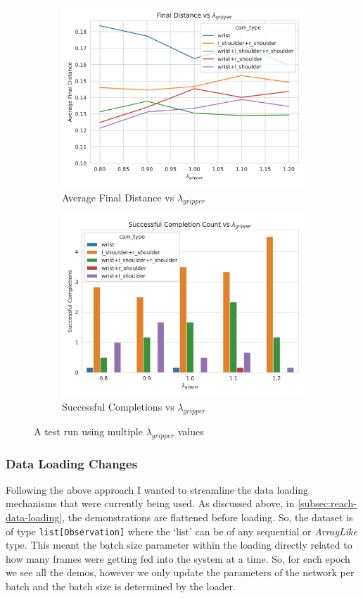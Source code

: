 \begin{figure}[htpb] %
  \centering
  \begin{subfigure}{0.45\linewidth}
    \centering
    \includegraphics[width=0.6\linewidth]{assets/cam-comb/grasp-simple/tuning-normal-old-policy-lambda-g.png}
    \caption{Average Final Distance vs $\lambda_{gripper}$}\label{subfig:grasp-tuning-lambda-g}
  \end{subfigure}
  \begin{subfigure}{0.45\linewidth}
    \centering
    \includegraphics[width=0.6\linewidth]{assets/cam-comb/grasp-simple/tuning-normal-old-policy-success-lambda-g.png}
    \caption{Successful Completions vs $\lambda_{gripper}$}\label{subfig:grasp-tuning-lambda-g-success}
  \end{subfigure}
  \caption{A test run using multiple $\lambda_{gripper}$ values}\label{fig:grasp-tuning-lambda-g}
\end{figure}


\subsubsection{Data Loading Changes}\label{subsec:grasp-data-loading-changes}
Following the above approach I wanted to streamline the data loading mechanisms that were currently being used. As discussed above, in \ref{subsec:reach-data-loading}, the demonstrations are flattened before loading. So, the dataset is of type \verb|list[Observation]| where the `list' can be of any sequential or \emph{ArrayLike} type. This meant the batch size parameter within the loading directly related to how many frames were getting fed into the system at a time. So, for each epoch we see all the demos, however we only update the parameters of the network per batch and the batch size is determined by the loader.

